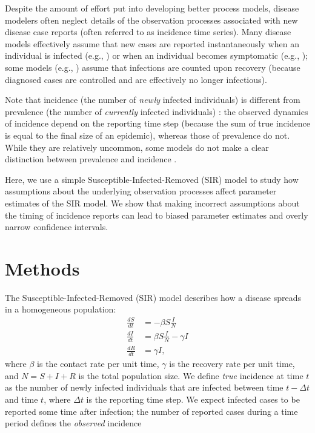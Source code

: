 \documentclass[12pt]{article}\usepackage[]{graphicx}\usepackage[]{color}
\begin{document}
Despite the amount of effort put into developing better process models, 
disease modelers often neglect details of the observation processes associated with
new disease case reports (often referred to as incidence time series).
Many disease models effectively assume that new cases are reported
instantaneously when an individual is infected (e.g., \cite{martinez2016differential, 
kennedy2018modeling, pons2018serotype}) or when an individual becomes symptomatic
(e.g., \cite{bhadra2011malaria, king2015avoidable}); 
some models (e.g., \cite{breto2009time, he2009plug, lin2016seasonality})
assume that infections are counted upon recovery (because diagnosed cases
are controlled and are effectively no longer infectious).

Note that incidence (the number of \emph{newly} infected individuals) is different from 
prevalence (the number of \emph{currently} infected individuals) \citep{bjornstad2018epidemics}:
the observed dynamics of incidence depend on the reporting time step (because the sum of 
true incidence is equal to the final size of an epidemic), whereas those of
prevalence do not.
While they are relatively
uncommon, some models do not make a clear distinction between prevalence and 
incidence 
\citep{capistran2009parameter, hooker2010parameterizing, yang2013stability, gonzalez2014fractional}.

Here, we use a simple Susceptible-Infected-Removed (SIR) model to study how
assumptions about the underlying observation processes affect parameter estimates
of the SIR model. We show that making incorrect assumptions about the timing of 
incidence reports can lead to biased parameter estimates and overly narrow 
confidence intervals.

\section{Methods}

The Susceptible-Infected-Removed (SIR) model describes how a disease spreads in a
homogeneous population:
\begin{equation}
\begin{aligned}
\frac{dS}{dt} &= - \beta S \frac{I}{N}\\
\frac{dI}{dt} &= \beta S \frac{I}{N} - \gamma I\\
\frac{dR}{dt} &= \gamma I,
\end{aligned}
\end{equation}
where $\beta$ is the contact rate per unit time, $\gamma$ is the recovery rate per unit time, 
and $N = S + I + R$ is the total population size. 
We define \emph{true} incidence at time $t$ as the number of newly infected
individuals that are infected between time $t- \Delta t$ and time $t$, where $\Delta t$ is
the reporting time step. We expect infected cases to be reported some time after infection;
the number of reported cases during a time period defines the \emph{observed} incidence
\end{document}

